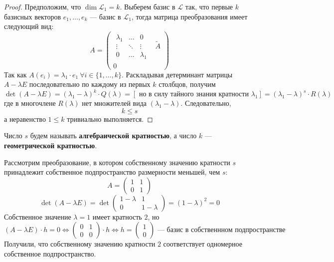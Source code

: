 \documentclass[11pt]{article}
\begin{document}
\begin{proof}
    Предположим, что $\dim \mathcal{L}_1 = k$. Выберем базис в $\mathcal{L}$ так,
    что первые $k$ базисных векторов $e_1, \dots, e_k$ --- базис в $\mathcal{L}_1$,
    тогда матрица преобразования имеет следующий вид: 
    \[ A = \left(
    \begin{array}{c|c}
        \begin{array}{ccc}
        \lambda_1 & \dots & 0 \\ \vdots & \ddots & \vdots \\ 0 & \dots & \lambda_1
        \end{array}
        & \widetilde{A} \\ 0 
    \end{array}\right)\]
    Так как $A(e_i) = \lambda_1 \cdot e_1 \ \forall i \in \{1, \dots, k\}$. Раскладывая
    детерминант матрицы $A - \lambda E$ последовательно по каждому из первых $k$
    столбцов, получим \[\det (A - \lambda E) = (\lambda_1 - \lambda)^k \cdot Q(\lambda) = 
    [ \text{ но в силу тайного знания кратности } \lambda_1] = (\lambda_1 - \lambda)^s \cdot R(\lambda)\]
    где в многочлене $R(\lambda)$ нет множителей вида $(\lambda_1 - \lambda)$. 
    Следовательно, \[k \leq s\] а неравенство $1 \leq k$ тривиально выполняется.
\end{proof}

\begin{definition}
    Число $s$ будем называть \textbf{алгебраической кратностью}, а число $k$ ---
    \textbf{геометрической кратностью}.
\end{definition}

\begin{example}
    Рассмотрим преобразование, в котором собственному значению кратности $s$
    принадлежит собственное подпространство размерности меньшей, чем $s$:
    \[A = \begin{pmatrix}
        1 & 1 \\ 0 & 1
    \end{pmatrix}\]
    \[\det (A - \lambda E) = \det \begin{pmatrix}
        1 - \lambda & 1 \\ 0 & 1 - \lambda
    \end{pmatrix} = (1 - \lambda)^2 = 0\]
    Собственное значение $\lambda = 1$ имеет кратность $2$, но \[(A - \lambda E) \cdot h 
    = 0 \Longleftrightarrow \begin{pmatrix}
        0 & 1 \\ 0 & 0
    \end{pmatrix} \cdot h \Longleftrightarrow h = \begin{pmatrix}
        1 \\ 0
    \end{pmatrix} \text{ --- базис в собственнном подпространстве}\]
    Получили, что собственному значению кратности $2$ соответствует одномерное
    собственное подпространство.
\end{example}
\end{document}
